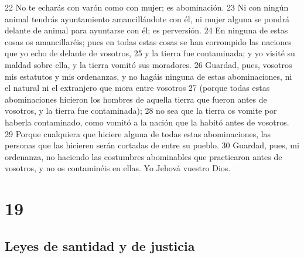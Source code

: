 22 No te echarás con varón como con mujer; es abominación.
23 Ni con ningún animal tendrás ayuntamiento amancillándote con él, ni mujer alguna se pondrá delante de animal para ayuntarse con él; es perversión.
24 En ninguna de estas cosas os amancillaréis; pues en todas estas cosas se han corrompido las naciones que yo echo de delante de vosotros,
25 y la tierra fue contaminada; y yo visité su maldad sobre ella, y la tierra vomitó sus moradores.
26 Guardad, pues, vosotros mis estatutos y mis ordenanzas, y no hagáis ninguna de estas abominaciones, ni el natural ni el extranjero que mora entre vosotros
27 (porque todas estas abominaciones hicieron los hombres de aquella tierra que fueron antes de vosotros, y la tierra fue contaminada);
28 no sea que la tierra os vomite por haberla contaminado, como vomitó a la nación que la habitó antes de vosotros.
29 Porque cualquiera que hiciere alguna de todas estas abominaciones, las personas que las hicieren serán cortadas de entre su pueblo.
30 Guardad, pues, mi ordenanza, no haciendo las costumbres abominables que practicaron antes de vosotros, y no os contaminéis en ellas. Yo Jehová vuestro Dios.  

\chapter{19}

\section{Leyes de santidad y de justicia}

